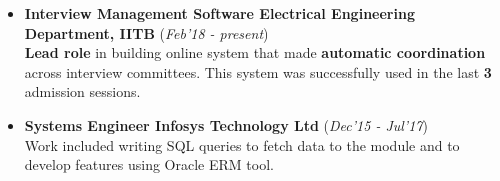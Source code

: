 \documentclass[10pt]{article}
\begin{document}
\colorbox{bl}{}
\vspace{-0.6cm}
\begin{itemize}[leftmargin=0.4cm]
    \item \textbf{Interview Management Software \textpipe \hspace{0.05cm} Electrical Engineering Department, IITB} \hfill{(\textit{Feb'18 - present})}\\
\vspace{-0.1cm}
\hspace{-0.09cm}\textbf{Lead role} in building online system that made \textbf{automatic coordination} across interview committees. This system was successfully used in the last \textbf{3} admission sessions.

\end{itemize}
    \vspace{-0.35cm}

\begin{itemize}[leftmargin=0.4cm]
    \item \textbf{Systems Engineer \textpipe  \hspace{0.05cm} Infosys Technology Ltd} \hfill{(\textit{Dec'15 - Jul'17})}\\
         Work included writing SQL queries to fetch data to the module and to develop features using Oracle ERM tool.
\end{itemize}
\vspace{-0.1cm}
\end{document}

